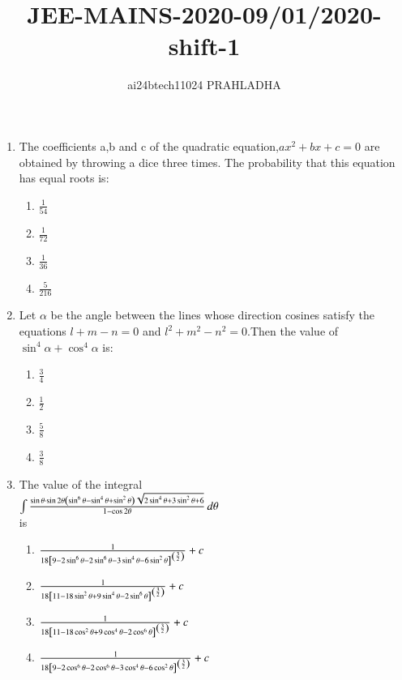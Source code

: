 \documentclass[journal,12pt,twocolumn]{IEEEtran}
\theoremstyle{remark}
\begin{document}

\vspace{3cm}
\title{JEE-MAINS-2020-09/01/2020-shift-1}
\author{ai24btech11024 PRAHLADHA%
}
\maketitle
\newpage
\bigskip
\renewcommand{\thefigure}{\theenumi}
\renewcommand{\thetable}{\theenumi}
\begin{enumerate}
\item The coefficients a,b and c of the quadratic equation,$ax^{2}+bx+c=0$ are obtained by throwing a dice three times. The probability that this equation has equal roots is$\colon$
\begin{enumerate}
    \item $\frac{1}{54}$
    \item $\frac{1}{72}$
    \item $\frac{1}{36}$
    \item $\frac{5}{216}$
\end{enumerate}
\item Let $\alpha$ be the angle between the lines whose direction cosines satisfy the equations $l+m-n=0$ and $l^{2}+m^{2}-n^{2}=0$.Then the value of $\sin^{4}\alpha+\cos^{4}\alpha$ is$\colon$
\begin{enumerate}
    \item $\frac{3}{4}$
    \item $\frac{1}{2}$
    \item $\frac{5}{8}$
    \item $\frac{3}{8}$
\end{enumerate}
\item The value of the integral\\
$\int \frac{\sin \theta \cdot \sin 2\theta \left( \sin^{6} \theta - \sin^{4} \theta + \sin^{2} \theta \right) \sqrt{2 \sin^{4} \theta + 3 \sin^{2} \theta + 6}}{1 - \cos 2\theta} \, d\theta$\\is
\begin{enumerate}
    \item $\frac{1}{18{}\left[9-2\sin^{6}\theta-2\sin^{6}\theta-3\sin^{4}\theta-6\sin^{2}\theta\right]^{\left(\frac{3}{2}\right)}}+c$
    \item $\frac{1}{18{}\left[11-18\sin^{2}\theta+9\sin^{4}\theta-2\sin^{6}\theta\right]^{\left(\frac{3}{2}\right)}}+c$
    \item $\frac{1}{18{}\left[11-18\cos^{2}\theta+9\cos^{4}\theta-2\cos^{6}\theta\right]^{\left(\frac{3}{2}\right)}}+c$
    \item $\frac{1}{18{}\left[9-2\cos^{6}\theta-2\cos^{6}\theta-3\cos^{4}\theta-6\cos^{2}\theta\right]^{\left(\frac{3}{2}\right)}}+c$

\end{enumerate}
\end{enumerate}
\end{document}
